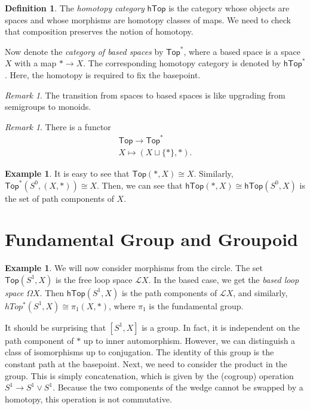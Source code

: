 \documentclass[leqno, openany]{memoir}
\theoremstyle{definition}
\newtheorem{defn}[thm]{Definition}
\newtheorem{exm}[thm]{Example}
\theoremstyle{remark}
\newtheorem{rmk}[thm]{Remark}
\theoremstyle{plain}
\theoremstyle{definition}
\theoremstyle{remark}
\newcommand{\mc}[1]{\mathcal{#1}}
\newcommand{\ms}[1]{\mathsf{#1}}
\begin{document}
\begin{defn}
The \textit{homotopy category} $\ms{hTop}$ is the category whose objects are spaces and whose morphisms are homotopy classes of maps. We need to check that composition preserves the notion of homotopy.
\end{defn}

Now denote the \textit{category of based spaces} by $\ms{Top}^*$, where a based space is a space $X$ with a map $* \to X$. The corresponding homotopy category is denoted by $\ms{hTop}^*$. Here, the homotopy is required to fix the basepoint.

\begin{rmk}
    The transition from spaces to based spaces is like upgrading from semigroups to monoids.
\end{rmk}

\begin{rmk}
    There is a functor 
    \begin{align*}
        \ms{Top} \to \ms{Top}^* \\
        X \mapsto (X \sqcup \{*\}, *).
    \end{align*}
\end{rmk}

\begin{exm}
    It is easy to see that $\ms{Top}(*,X) \cong X$. Similarly, $\ms{Top}^*(S^0,(X,*)) \cong X$. Then, we can see that $\ms{hTop}(*,X) \cong \ms{hTop}(S^0,X)$ is the set of path components of $X$.
\end{exm}

\section{Fundamental Group and Groupoid}%
\label{sec:fundamental_group_and_groupoid}

\begin{exm}
    We will now consider morphisms from the circle. The set $\ms{Top}(S^1,X)$ is the free loop space $\mc{L}X$. In the based case, we get the \textit{based loop space} $\Omega X$. Then $\ms{hTop}(S^1,X)$ is the path components of $\mc{L}X$, and similarly, $hTop^*(S^1,X) \cong \pi_1(X,*)$, where $\pi_1$ is the fundamental group.
\end{exm}

It should be surprising that $[S^1,X]$ is a group. In fact, it is independent on the path component of $*$ up to inner automorphism. However, we can distinguish a class of isomorphisms up to conjugation. The identity of this group is the constant path at the basepoint. Next, we need to consider the product in the group. This is simply concatenation, which is given by the (cogroup) operation $S^1 \to S^1 \vee S^1$. Because the two components of the wedge cannot be swapped by a homotopy, this operation is not commutative.
\end{document}
